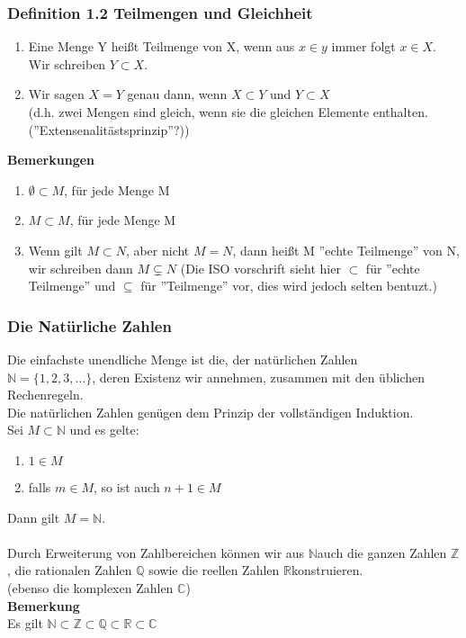 \documentclass{article}
\newcommand{\N}{\mathbb{N}}
\newcommand{\mR}{$\mathbb{R}$}
\newcommand{\mN}{$\mathbb{N}$}
\begin{document}
\subsubsection{Definition 1.2 Teilmengen und Gleichheit}
\begin{enumerate}
\item{Eine Menge Y hei\ss{}t Teilmenge von X, wenn aus $x \in y$ immer folgt $x \in X$. Wir schreiben $Y \subset X$.}
\item{Wir sagen $X=Y$ genau dann, wenn $X \subset Y$ und $Y \subset X$\\
(d.h. zwei Mengen sind gleich, wenn sie die gleichen Elemente enthalten. (''Extensenalitästsprinzip''?))}
\end{enumerate}
\textbf{Bemerkungen}
\begin{enumerate}
\item{$\emptyset \subset M$, für jede Menge M}
\item{$M \subset M$, für jede Menge M}
\item{Wenn gilt $M \subset N$, aber nicht $M = N$, dann hei\ss{}t M ''echte Teilmenge'' von N, wir schreiben dann $M \subsetneq N$ (Die ISO vorschrift sieht hier $\subset$ für ''echte Teilmenge'' und $\subseteq$ für ''Teilmenge'' vor, dies wird jedoch selten bentuzt.)}
\end{enumerate}

\subsubsection{Die Natürliche Zahlen}
Die einfachste unendliche Menge ist die, der natürlichen Zahlen\\
$\N = \{1, 2, 3, \dots\}$, deren Existenz wir annehmen, zusammen mit den üblichen Rechenregeln.\\
Die natürlichen Zahlen genügen dem Prinzip der vollständigen Induktion.\\
Sei $M \subset \N$ und es gelte:
\begin{enumerate}
\item{$1 \in M$}
\item{falls $m \in M$, so ist auch $n + 1 \in M$}
\end{enumerate}
Dann gilt $M = \N$.\\
\\
Durch Erweiterung von Zahlbereichen können wir aus \mN auch die ganzen Zahlen $\mathbb{Z}$, die rationalen Zahlen $\mathbb{Q}$ sowie die reellen Zahlen \mR konstruieren.\\
(ebenso die komplexen Zahlen $\mathbb{C}$)\\
\textbf{Bemerkung}\\
Es gilt $\N \subset \mathbb{Z} \subset \mathbb{Q} \subset \mathbb{R} \subset \mathbb{C}$\\
\end{document}
